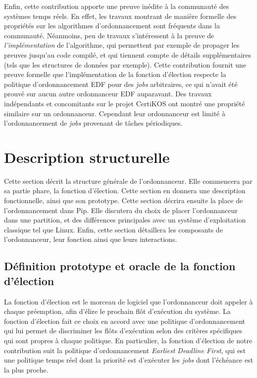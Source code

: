 	Enfin, cette contribution apporte une preuve inédite à la communauté des systèmes temps réels. En effet, les travaux montrant de manière formelle des propriétés sur les algorithmes d'ordonnancement sont fréquents dans la communauté. Néanmoins, peu de travaux s'intéressent à la preuve de \emph{l'implémentation} de l'algorithme, qui permettent par exemple de propager les preuves jusqu'au code compilé, et qui tiennent compte de détails supplémentaires (tels que les structures de données par exemple). Cette contribution fournit une preuve formelle que l'implémentation de la fonction d'élection respecte la politique d'ordonnancement EDF pour des \emph{jobs} arbitraires, ce qui n'avait été prouvé sur aucun autre ordonnanceur EDF auparavant. Des travaux indépendants et concomitants sur le projet CertiKOS ont montré une propriété similaire sur un ordonnanceur. Cependant leur ordonnanceur est limité à l'ordonnancement de \emph{jobs} provenant de tâches périodiques.

	\section{Description structurelle}

		Cette section décrit la structure générale de l'ordonnanceur. Elle commencera par sa partie phare, la fonction d'élection. Cette section en donnera une description fonctionnelle, ainsi que son prototype. Cette section décrira ensuite la place de l'ordonnancement dans Pip. Elle discutera du choix de placer l'ordonnanceur dans une partition, et des différences principales avec un système d'exploitation classique tel que Linux. Enfin, cette section détaillera les composants de l'ordonnanceur, leur fonction ainsi que leurs interactions.

		\subsection{Définition prototype et oracle de la fonction d'élection}

		La fonction d'élection est le morceau de logiciel que l'ordonnanceur doit appeler à chaque préemption, afin d'élire le prochain flôt d'exécution du système. La fonction d'élection fait ce choix en accord avec une politique d'ordonnancement qui lui permet de discriminer les flôts d'exécution selon des critères spécifiques qui sont propres à chaque politique. En particulier, la fonction d'élection de notre contribution suit la politique d'ordonnancement \emph{Earliest Deadline First}, qui est une politique temps réel dont la priorité est d'exécuter les \emph{jobs} dont l'échéance est la plus proche.

